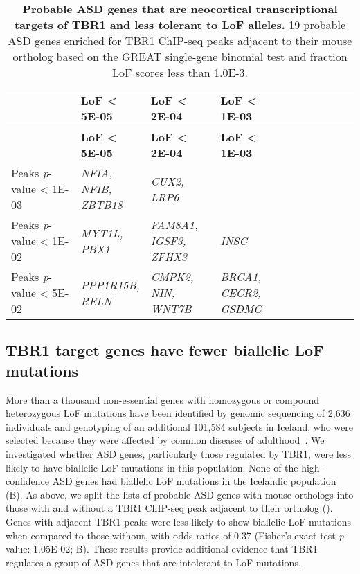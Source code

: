 \begin{center}
\begin{longtable}
{@{}p{0.2\linewidth}p{0.2\linewidth}p{0.2\linewidth}p{0.2\linewidth}p{0.2\linewidth}@{}}
\caption[Probable ASD genes that are neocortical transcriptional
targets of TBR1 and less tolerant to LoF alleles]{{\bf Probable ASD genes that are neocortical transcriptional
targets of TBR1 and less tolerant to LoF alleles.}
19 probable ASD genes
enriched for TBR1 ChIP-seq peaks adjacent to their mouse ortholog based
on the GREAT single-gene binomial test and fraction LoF scores less than
1.0E-3.
}
\label{tab:autismTab3} \\

\hline ~ & \textbf{LoF \textless{} 5E-05} & \textbf{LoF \textless{} 2E-04} & \textbf{LoF \textless{} 1E-03} \\ \hline 
\endfirsthead

\hline ~ & \textbf{LoF \textless{} 5E-05} & \textbf{LoF \textless{} 2E-04} & \textbf{LoF \textless{} 1E-03} \\ \hline 
\endhead

\hline
\endlastfoot

Peaks \emph{p}-value \textless{} 1E-03 & \emph{NFIA, NFIB, ZBTB18} &
\emph{CUX2, LRP6} & ~\tabularnewline
Peaks \emph{p}-value \textless{} 1E-02 & \emph{MYT1L, PBX1} &
\emph{FAM8A1, IGSF3, ZFHX3} & \emph{INSC}\tabularnewline
Peaks \emph{p}-value \textless{} 5E-02 & \emph{PPP1R15B, RELN} &
\emph{CMPK2, NIN, WNT7B} & \emph{BRCA1, CECR2, GSDMC}\tabularnewline
\end{longtable}
\end{center}

\subsection{TBR1 target genes have fewer biallelic LoF mutations}

More than a thousand non-essential genes with homozygous or compound
heterozygous LoF mutations have been identified by genomic sequencing of
2,636 individuals and genotyping of an additional 101,584 subjects in
Iceland, who were selected because they were affected by common diseases
of adulthood~\citep{Sulem:2015fi}. We investigated whether ASD genes,
particularly those regulated by TBR1, were less likely to have biallelic
LoF mutations in this population. None of the high-confidence ASD genes
had biallelic LoF mutations in the Icelandic population (B). As
above, we split the lists of probable ASD genes with mouse orthologs
into those with and without a TBR1 ChIP-seq peak adjacent to their
ortholog (). Genes with adjacent TBR1 peaks were
less likely to show biallelic LoF mutations when compared to those
without, with odds ratios of 0.37 (Fisher's exact test \emph{p-}value:
1.05E-02; B). These results provide additional evidence that TBR1
regulates a group of ASD genes that are intolerant to LoF mutations.

